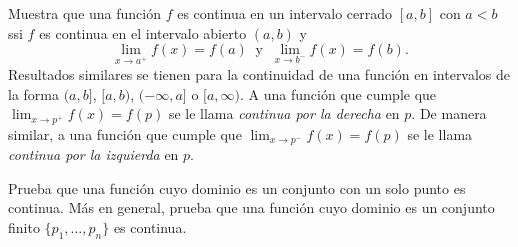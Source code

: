 \documentclass[12pt,a4paper]{book}
\begin{document}
    \begin{ejercicio}\label{ej:204}
        Muestra que una función $f$ es continua en un intervalo cerrado
        $[a,b]$ con $a<b$ ssi $f$ es continua en el intervalo abierto $(a,b)$ y
        \begin{equation*}
            \lim_{x\to a^{+}}f(x)=f(a)\ \text{ y }\ \lim_{x\to b^{-}}f(x)=f(b).
        \end{equation*}
        Resultados similares se tienen para la continuidad de una función en intervalos
        de la forma $(a,b]$, $[a,b)$, $(-\infty,a]$ o $[a,\infty)$. A una función que cumple
        que $\lim_{x\to p^{+}}f(x)=f(p)$ se le llama \textit{continua por la derecha} en $p$. De
        manera similar, a una función que cumple que $\lim_{x\to p^{-}}f(x)=f(p)$ se le llama
        \textit{continua por la izquierda} en $p$.
    \end{ejercicio}

    \begin{ejercicio}\label{ej:205}
        Prueba que una función cuyo dominio es un conjunto con un
        solo punto es continua. Más en general, prueba que una función cuyo dominio
        es un conjunto finito $\{p_{1},\ldots,p_{n}\}$ es continua.
    \end{ejercicio}
\end{document}
